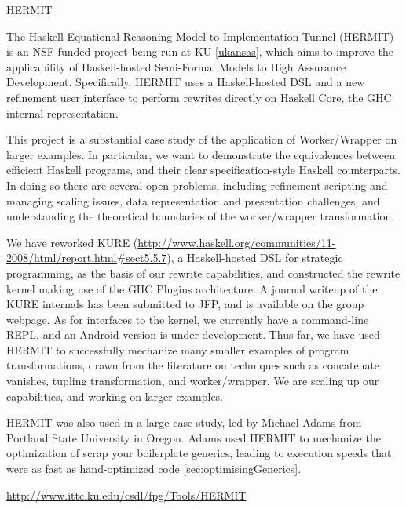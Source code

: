 \begin{hcarentry}[updated]{HERMIT}
\label{HERMIT}
\makeheader

The Haskell Equational Reasoning Model-to-Implementation Tunnel
(HERMIT) is an NSF-funded project being run at KU \cref{ukansas}, which aims to improve the
applicability of Haskell-hosted Semi-Formal Models to High Assurance Development.
Specifically, HERMIT uses a Haskell-hosted DSL
and a new refinement user interface to perform rewrites directly on Haskell Core, the GHC internal representation.

This project is a substantial case study of the application of
Worker/Wrapper on larger examples. In particular, we want to
demonstrate the equivalences between efficient Haskell programs, and
their clear specification-style Haskell counterparts. In doing so
there are several open problems, including refinement scripting and
managing scaling issues, data representation and presentation
challenges, and understanding the theoretical boundaries of the
worker/wrapper transformation.

We have reworked KURE (\url{http://www.haskell.org/communities/11-2008/html/report.html#sect5.5.7}),
a Haskell-hosted DSL for strategic programming, as the basis of our rewrite capabilities,
and constructed the rewrite kernel making use of the GHC Plugins architecture.
A journal writeup of the KURE internals has been submitted to JFP, and is available
on the group webpage.
As for interfaces to the kernel,
we currently have a command-line REPL, and an Android version is under development.
Thus far, we have used HERMIT to successfully mechanize many smaller examples of program transformations,
drawn from the literature on techniques such as concatenate vanishes, tupling transformation, and worker/wrapper.
We are scaling up our capabilities, and working on larger examples.

HERMIT was also used in a large case study, led by Michael Adams from Portland State University
in Oregon. Adams used HERMIT to mechanize the optimization of scrap your boilerplate generics,
leading to execution speeds that were as fast as hand-optimized code \cref{sec:optimisingGenerics}.

\FurtherReading
  \url{http://www.ittc.ku.edu/csdl/fpg/Tools/HERMIT}
\end{hcarentry}
